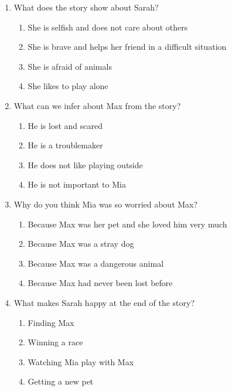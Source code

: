 \documentclass[12pt]{article}
\begin{document}
\begin{enumerate}
    \item What does the story show about Sarah?
    \begin{enumerate}[label=\Alph*.]
        \item She is selfish and does not care about others
        \item She is brave and helps her friend in a difficult situation
        \item She is afraid of animals
        \item She likes to play alone
    \end{enumerate}
    \vspace{0.5cm}

    \item What can we infer about Max from the story?
    \begin{enumerate}[label=\Alph*.]
        \item He is lost and scared
        \item He is a troublemaker
        \item He does not like playing outside
        \item He is not important to Mia
    \end{enumerate}
    \vspace{0.5cm}

    \item Why do you think Mia was so worried about Max?
    \begin{enumerate}[label=\Alph*.]
        \item Because Max was her pet and she loved him very much
        \item Because Max was a stray dog
        \item Because Max was a dangerous animal
        \item Because Max had never been lost before
    \end{enumerate}
    \vspace{0.5cm}

\vspace{1cm}
    \item What makes Sarah happy at the end of the story?
    \begin{enumerate}[label=\Alph*.]
        \item Finding Max
        \item Winning a race
        \item Watching Mia play with Max
        \item Getting a new pet
    \end{enumerate}
    \vspace{0.5cm}


\end{enumerate}
\end{document}
